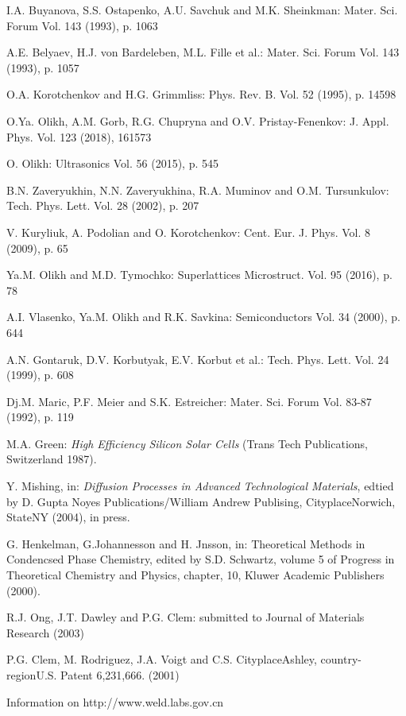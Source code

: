 \documentclass{ttp}
\begin{document}
\begin{thebibliography}{99}
 I.A. Buyanova, S.S. Ostapenko, A.U. Savchuk and M.K. Sheinkman: Mater. Sci. Forum Vol. 143 (1993), p. 1063

 A.E. Belyaev, H.J. von Bardeleben, M.L. Fille et al.: Mater. Sci. Forum Vol. 143 (1993), p. 1057

 O.A. Korotchenkov and H.G. Grimmliss: Phys. Rev. B. Vol. 52 (1995), p. 14598

  O.Ya. Olikh, A.M. Gorb, R.G. Chupryna and O.V. Pristay-Fenenkov: J. Appl. Phys. Vol. 123 (2018), 161573

 O. Olikh: Ultrasonics Vol. 56 (2015), p. 545

 B.N. Zaveryukhin, N.N. Zaveryukhina, R.A. Muminov and O.M. Tursunkulov: Tech. Phys. Lett. Vol. 28 (2002), p. 207

 V. Kuryliuk, A. Podolian and O. Korotchenkov: Cent. Eur. J. Phys. Vol. 8 (2009), p. 65

 Ya.M. Olikh and M.D. Tymochko: Superlattices Microstruct. Vol. 95 (2016), p. 78

 A.I. Vlasenko,  Ya.M. Olikh  and R.K. Savkina: Semiconductors Vol. 34 (2000), p. 644

 A.N. Gontaruk,  D.V. Korbutyak, E.V. Korbut et al.: Tech. Phys. Lett. Vol. 24 (1999), p. 608


 Dj.M. Maric, P.F. Meier and S.K. Estreicher: Mater. Sci. Forum Vol. 83-87 (1992), p. 119

 M.A. Green: \textit{High Efficiency Silicon Solar Cells }(Trans Tech Publications, Switzerland 1987).

 Y. Mishing, in: \textit{Diffusion Processes in Advanced Technological Materials},
edtied by D. Gupta Noyes Publications/William Andrew Publising, CityplaceNorwich, StateNY (2004), in press.

 G. Henkelman, G.Johannesson and H. Jnsson, in: Theoretical Methods in Condencsed
Phase Chemistry, edited by S.D. Schwartz, volume 5 of Progress in Theoretical Chemistry and Physics, chapter,
10, Kluwer Academic Publishers (2000).

 R.J. Ong, J.T. Dawley and P.G. Clem: submitted to Journal of Materials Research (2003)

 P.G. Clem, M. Rodriguez, J.A. Voigt and C.S. CityplaceAshley, country-regionU.S. Patent 6,231,666. (2001)

  Information on http://www.weld.labs.gov.cn

\end{thebibliography}
\end{document}

